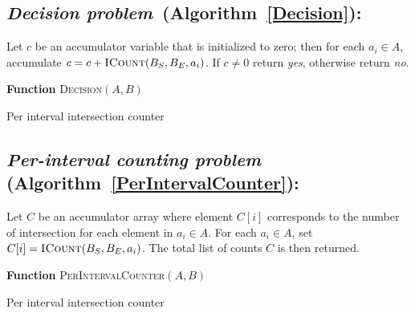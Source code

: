 \subsection {{\em Decision problem}~(Algorithm~\ref{Decision}):} Let $c$ be an accumulator variable that is
    initialized to zero; then for each $a_i \in A$, accumulate $c = c +
    \textsc{ICount}(B_S,B_E,a_i)$.  If $c\ne0$ return {\em yes}, otherwise
    return {\em no}.

	 \begin{algorithm}[h!]
		\label{Decision}
	 	\DontPrintSemicolon
	 	\footnotesize
	 	\BlankLine
	 	\textbf{Function} \textsc{Decision}$(A,B)$
	 	\caption{Per interval intersection counter}
	 \end{algorithm}


\subsection {{\em Per-interval counting problem}
	(Algorithm~\ref{PerIntervalCounter}):}
	 Let $C$ be an accumulator array where element $C[i]$ corresponds to the
	 number of intersection for each element in $a_i\in A$.  For each 
	 $a_i \in A$, set $C[i]=\textsc{ICount}(B_S,B_E,a_i)$.  The total list of
	 counts $C$ is then returned.

	 \begin{algorithm}[h!]
	 	\DontPrintSemicolon
	 	\footnotesize
	 	\BlankLine
	 	\textbf{Function} \textsc{PerIntervalCounter}$(A,B)$
	 	\caption{Per interval intersection counter}
		\label{PerIntervalCounter}
	 \end{algorithm}

